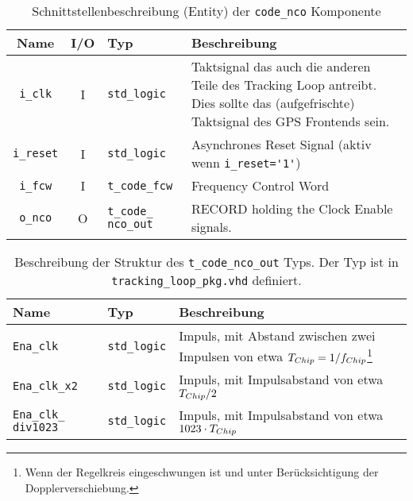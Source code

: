 \begin{table}[htbp]
    \ttabbox
    {
        \caption[Code NCO Schnittstelle]{Schnittstellenbeschreibung (Entity) der \lstinline$code_nco$ Komponente}
        \label{TabCodeNCO_Entity}
    }
    {
    \begin{tabular}{c c  p{2cm} p{6cm}}
        \toprule
        Name                    & I/O  & Typ                               & Beschreibung \\
        \midrule
        \lstinline$i_clk$       & I         & \lstinline$std_logic$             & Taktsignal das auch die anderen Teile des Tracking Loop antreibt. Dies sollte das (aufgefrischte) Taktsignal des GPS Frontends sein.\\
        \lstinline$i_reset$     & I         & \lstinline$std_logic$             & Asynchrones Reset Signal (aktiv wenn \lstinline$i_reset='1'$) \\
        \lstinline$i_fcw$    & I         & \lstinline$t_code_fcw$             & Frequency Control Word \\
        \lstinline$o_nco$       & O         & \lstinline$t_code_ nco_out$ & RECORD holding the Clock Enable signals. \\
        \bottomrule
    \end{tabular}
}
\end{table}

\begin{table}[htbp]
    \ttabbox
    {
        \caption[Typdefinition Code NCO Ausgangssignal]{Beschreibung der Struktur des \lstinline$t_code_nco_out$ Typs. Der Typ ist in \lstinline$tracking_loop_pkg.vhd$ definiert.}
        \label{TabCodeNCO_Type}
    }
    {
    \begin{tabular}{p{2cm}  p{2cm} p{6cm}}
        \toprule
        Name				& Typ                   & Beschreibung \\
        \midrule
        \lstinline$Ena_clk$		& \lstinline$std_logic$	& Impuls, mit Abstand zwischen zwei Impulsen von etwa ${T}_{Chip}=1/f_{Chip}$\footnote{Wenn der Regelkreis eingeschwungen ist und unter Berücksichtigung der Dopplerverschiebung.} \\
        \lstinline$Ena_clk_x2$		& \lstinline$std_logic$	& Impuls, mit Impulsabstand von etwa ${T}_{Chip}/2$ \\
        \lstinline$Ena_clk_ div1023$	& \lstinline$std_logic$	& Impuls, mit Impulsabstand von etwa $1023\cdot {T}_{Chip}$ \\
        \bottomrule
    \end{tabular}
}
\end{table}


